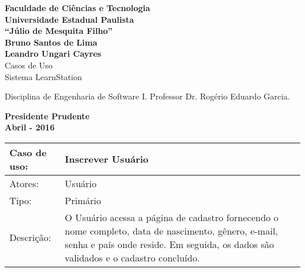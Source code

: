 \documentclass[12pt,a4paper,onecolumn,titlepage]{article}
\begin{document}

\begin{titlepage} %
	
	\vfill
	\begin{center}
	
		{\large \textbf{Faculdade de Ciências e Tecnologia\\Universidade Estadual Paulista\\``Júlio de Mesquita Filho''}} \\[3cm]
		{\large \textbf{Bruno Santos de Lima}}\\
		{\large \textbf{Leandro Ungari Cayres}}\\[4cm]
		{\Large Casos de Uso}\\
		{\Large Sistema LearnStation}\\[4cm]

	\hspace{.45\textwidth} %
	\begin{minipage}{.5\textwidth}
		\large Disciplina de Engenharia de Software I. Professor Dr. Rogério Eduardo Garcia.\\[0.5cm]
	\end{minipage}

	\vfill
	\vspace{1.5cm}
	
	\large \textbf{Presidente Prudente\\}
	\large \textbf{Abril - 2016}
	
	\end{center}
	
\end{titlepage}

\renewcommand{\baselinestretch}{1.5}

\begin{table}[h!]
\begin{center}
\begin{tabular}{p{2.5cm} p{9.5cm}}
Caso de uso: & \textbf{Inscrever Usuário} \\ \hline
Atores: & Usuário \\ \hline
Tipo: & Primário \\ \hline
Descrição: & O Usuário acessa a página de cadastro fornecendo o nome completo, data de nascimento, gênero, e-mail, senha e país onde reside. Em seguida, os dados são validados e o cadastro concluído.

\end{tabular}
\end{center}
\end{table}
\end{document}
